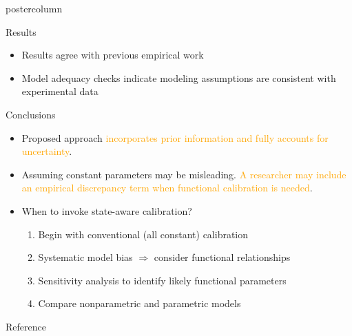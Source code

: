\documentclass[final,10pt]{beamer}  %
\begin{document}
\begin{frame}{}
\begin{columns}[t]
\begin{column}{.33\textwidth}
\begin{beamercolorbox}[center,wd=1.625\textwidth]{postercolumn}
\begin{minipage}[T]{\textwidth}
{\begin{block}{Results}
{        \begin{itemize}\itemsep2ex
            \item
            Results agree with previous empirical work

            \item
            Model adequacy checks indicate modeling assumptions are consistent with experimental data
        \end{itemize}

        }
        \end{block}
        \vfill

         \begin{block}{Conclusions}
            {\small
          \begin{itemize}\itemsep2ex
                \item
                Proposed approach \textcolor{orange}{incorporates prior information and fully accounts for uncertainty}.

                \item
                Assuming constant parameters may be misleading. \textcolor{orange}{A researcher may include an empirical discrepancy term when functional calibration is needed}.

                \item
                When to invoke state-aware calibration?
                \begin{enumerate}
                    \item
                    Begin with conventional (all constant) calibration

                    \item
                    Systematic model bias $\Rightarrow$ consider functional relationships

                    \item
                    Sensitivity analysis to identify likely functional parameters

                    \item
                    Compare nonparametric and parametric models
                \end{enumerate}

            \end{itemize}
          }
        \end{block}
        \vfill

        \begin{block}{Reference}
            {\small

}
\end{block}}
\end{minipage}
\end{beamercolorbox}
\end{column}
\end{columns}
\end{frame}
\end{document}
